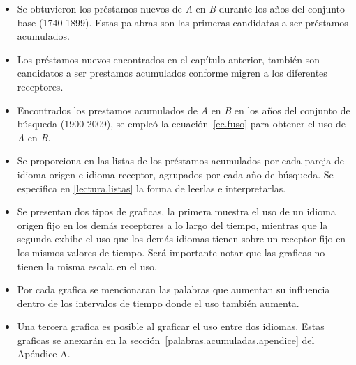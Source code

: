\begin{itemize}
	
	\item Se obtuvieron los préstamos nuevos de \textit{A} en \textit{B} durante los años del conjunto base (1740-1899). Estas palabras son las primeras candidatas a ser préstamos acumulados.
	
	\item Los préstamos nuevos encontrados en el capítulo anterior, también son candidatos a ser prestamos acumulados conforme migren a los diferentes receptores.
	
	\item Encontrados los prestamos acumulados de \textit{A} en \textit{B} en los años del conjunto de búsqueda (1900-2009),  se empleó la ecuación~\ref{ec.fuso} para obtener el uso de \textit{A} en \textit{B}.
	
	\item Se proporciona en \cite{prestamos_acumulados} las listas de los préstamos acumulados por cada pareja de idioma origen e idioma receptor, agrupados por cada año de búsqueda. Se especifica en \ref{lectura.listas} la forma de leerlas e interpretarlas. 
	
	\item Se presentan dos tipos de graficas, la primera muestra el uso de un idioma origen fijo en los demás receptores a lo largo del tiempo, mientras que la segunda exhibe el uso que los demás idiomas tienen sobre un receptor fijo en los mismos valores de tiempo.  Será importante notar que las graficas no tienen la misma escala en el uso.
	 
	\item Por cada grafica se mencionaran las palabras que aumentan su influencia  dentro de los intervalos de tiempo donde el uso también aumenta. 
	
	\item Una tercera grafica es posible al graficar el uso entre dos idiomas. Estas graficas se anexarán en la sección~\ref{palabras.acumuladas.apendice} del Apéndice A.
	
	
\end{itemize}

